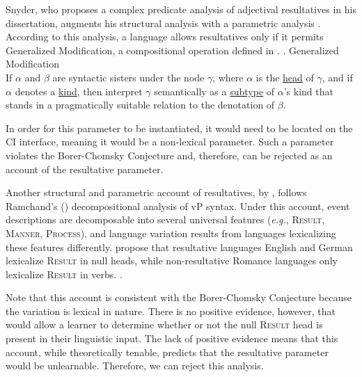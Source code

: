 \documentclass[MilwayThesis]{subfiles}
\begin{document}
Snyder, who proposes a complex predicate analysis of adjectival resultatives in his \citeyear{snyder1995language} dissertation, augments his structural analysis with a parametric analysis \parencite{snyder2012parameter}.
According to this analysis, a language allows resultatives only if it permits Generalized Modification, a compositional operation defined in \Next.
\ex. Generalized Modification \parencite{snyder2012parameter}\\
If $\alpha$ and $\beta$ are syntactic sisters under the node $\gamma$, where $\alpha$ is the \uline{head} of $\gamma$, and if $\alpha$ denotes a \uline{kind}, then interpret $\gamma$ semantically as a \uline{subtype} of $\alpha$'s kind that stands in a pragmatically suitable relation to the denotation of $\beta$.

In order for this parameter to be instantiated, it would need to be located on the CI interface, meaning it would be a non-lexical parameter.
Such a parameter violates the Borer-Chomsky Conjecture and, therefore, can be rejected as an account of the resultative parameter.

Another structural and parametric account of resultatives, by \textcite{son2008microparameters}, follows Ramchand's (\citeyear{ramchand2008verb}) decompositional analysis of vP syntax.
Under this account, event descriptions are decomposable into several universal features (\textit{e.g.}, \textsc{Result}, \textsc{Manner}, \textsc{Process}), and language variation results from languages lexicalizing these features differently.
\textcite{son2008microparameters} propose that resultative languages English and German lexicalize \textsc{Result} in null heads, while non-resultative Romance languages only lexicalize \textsc{Result} in verbs.
\ex.

Note that this account is consistent with the Borer-Chomsky Conjecture because the variation is lexical in nature.
There is no positive evidence, however, that would allow a learner to determine whether or not the null \textsc{Result} head is present in their linguistic input.
The lack of positive evidence means that this account, while theoretically tenable, predicts that the resultative parameter would be unlearnable.
Therefore, we can reject this analysis.
\end{document}
